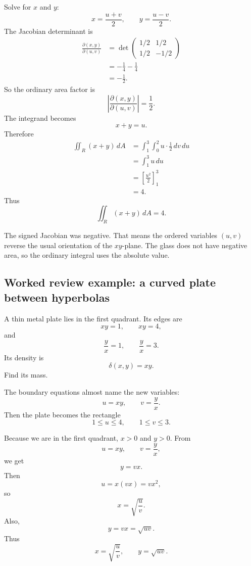 Solve for \(x\) and \(y\):
\[
    x=\frac{u+v}{2},
    \qquad
    y=\frac{u-v}{2}.
\]
The Jacobian determinant is
\[
\begin{aligned}
    \frac{\partial(x,y)}{\partial(u,v)}
    &=
    \det
    \begin{pmatrix}
    1/2&1/2\\
    1/2&-1/2
    \end{pmatrix}  \\
    &=
    -\frac14-\frac14\\
    &=
    -\frac12.
\end{aligned}
\]
So the ordinary area factor is
\[
    \left|
    \frac{\partial(x,y)}{\partial(u,v)}
    \right|
    =
    \frac12.
\]
The integrand becomes
\[
    x+y=u.
\]
Therefore
\[
\begin{aligned}
\iint_R (x+y)\,dA
&=
\int_1^3\int_0^2
u\cdot\frac12\,dv\,du\\
&=
\int_1^3 u\,du\\
&=
\left[\frac{u^2}{2}\right]_1^3\\
&=
4.
\end{aligned}
\]
Thus
\[
\boxed{
    \iint_R (x+y)\,dA=4.
}
\]

The signed Jacobian was negative.  That means the ordered variables \((u,v)\) reverse
the usual orientation of the \(xy\)-plane.  The glass does not have negative area, so the
ordinary integral uses the absolute value.

\subsection{Worked review example: a curved plate between hyperbolas}

A thin metal plate lies in the first quadrant.  Its edges are
\[
    xy=1,\qquad xy=4,
\]
and
\[
    \frac{y}{x}=1,\qquad \frac{y}{x}=3.
\]
Its density is
\[
    \delta(x,y)=xy.
\]
Find its mass.

The boundary equations almost name the new variables:
\[
    u=xy,
    \qquad
    v=\frac{y}{x}.
\]
Then the plate becomes the rectangle
\[
    1\le u\le4,
    \qquad
    1\le v\le3.
\]

Because we are in the first quadrant, \(x>0\) and \(y>0\).  From
\[
    u=xy,
    \qquad
    v=\frac{y}{x},
\]
we get
\[
    y=vx.
\]
Then
\[
    u=x(vx)=vx^2,
\]
so
\[
    x=\sqrt{\frac{u}{v}}.
\]
Also,
\[
    y=vx=\sqrt{uv}.
\]
Thus
\[
    x=\sqrt{\frac{u}{v}},
    \qquad
    y=\sqrt{uv}.
\]

